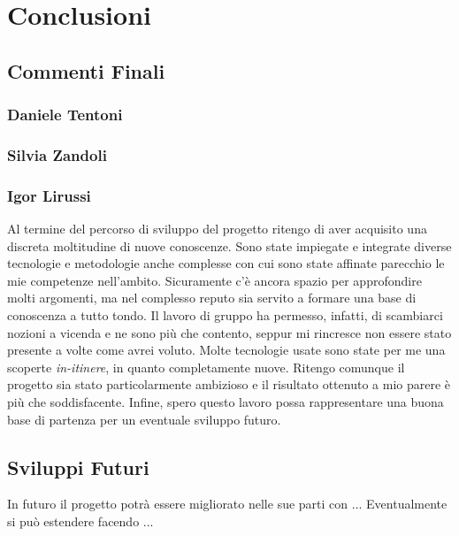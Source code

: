 
\chapter{Conclusioni}
    \section{Commenti Finali}
        \subsection{Daniele Tentoni}
        \subsection{Silvia Zandoli}
        \subsection{Igor Lirussi}
        Al termine del percorso di sviluppo del progetto ritengo di aver acquisito una discreta moltitudine di nuove conoscenze. Sono state impiegate e integrate diverse tecnologie e metodologie anche complesse con cui sono state affinate parecchio le mie competenze nell'ambito. Sicuramente c'è ancora spazio per approfondire molti argomenti, ma nel complesso reputo sia servito a formare una base di conoscenza a tutto tondo. Il lavoro di gruppo ha permesso, infatti, di scambiarci nozioni a vicenda e ne sono più che contento, seppur mi rincresce non essere stato presente a volte come avrei voluto. Molte tecnologie usate sono state per me una scoperte \emph{in-itinere}, in quanto completamente nuove. Ritengo comunque il progetto sia stato particolarmente ambizioso e il risultato ottenuto a mio parere è più che soddisfacente. Infine, spero questo lavoro possa rappresentare una buona base di partenza per un eventuale sviluppo futuro. 
    \section{Sviluppi Futuri}
    In futuro il progetto potrà essere migliorato nelle sue parti con ...
    Eventualmente si può estendere facendo ...
